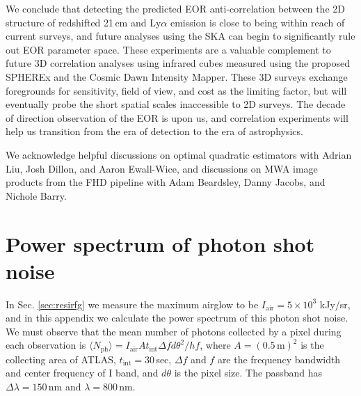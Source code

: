 \documentclass[numberedappendix]{emulateapj}
\begin{document}
We conclude that detecting the predicted EOR anti-correlation between the 2D structure of redshifted 21\,cm and Ly$\alpha$ emission is close to being within reach of current surveys, and future analyses using the SKA can begin to significantly rule out EOR parameter space. These experiments are a valuable complement to future 3D correlation analyses using infrared cubes measured using the proposed SPHEREx and the Cosmic Dawn Intensity Mapper. These 3D surveys exchange foregrounds for sensitivity,  field of view, and cost as the limiting factor, but will eventually probe the short spatial scales inaccessible to 2D surveys. The decade of direction observation of the EOR is upon us, and correlation experiments will help us transition from the era of detection to the era of astrophysics.

\begin{acknowledgments}
We acknowledge helpful discussions on optimal quadratic estimators with Adrian Liu, Josh Dillon, and Aaron Ewall-Wice, and discussions on MWA image products from the FHD pipeline with Adam Beardsley, Danny Jacobs, and Nichole Barry. 
\end{acknowledgments}

\appendix

\section{Power spectrum of photon shot noise}
\label{sec:Pshot}

In Sec. \ref{sec:resirfg} we measure the maximum airglow to be $I_\text{air}=5\times10^3$ kJy/sr, and in this appendix we calculate the power spectrum of this photon shot noise. We must observe that the mean number of photons collected by a pixel during each observation is $\langle N_\text{ph}\rangle=I_\text{air}At_\text{int} \Delta f d\theta^2/hf$, where $A=(0.5\,\text{m})^2$ is the collecting area of ATLAS, $t_\text{int}=30\,$sec, $\Delta f$ and $f$ are the frequency bandwidth and center frequency of I band, and $d\theta$ is the pixel size. The passband has $\Delta\lambda=150\,$nm and $\lambda=800\,$nm. 
\end{document}
